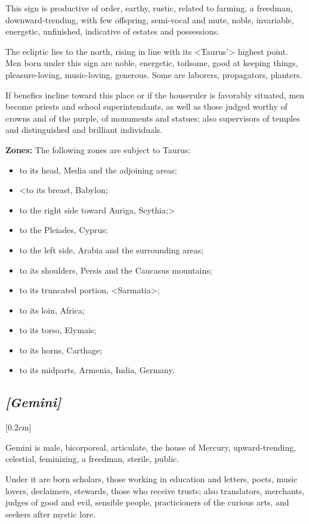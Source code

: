 This sign is productive of order, earthy, rustic, related to farming, a freedman, downward-trending, with few offspring, semi-vocal and mute, noble, invariable, energetic, unfinished, indicative of estates and possessions. 

The ecliptic lies to the north, rising in line with its <Taurus’> highest point. Men born under this sign are noble, energetic, toilsome, good at keeping things, pleasure-loving, music-loving, generous. Some are laborers, propagators, planters. 

If benefics incline toward this place or if the houseruler is favorably situated, men become priests and school superintendants, as well as those judged worthy of crowns and of the purple, of monuments and statues; also supervisors of temples and distinguished and brilliant individuals.

\textbf{Zones:} The following zones are subject to Taurus: 
\begin{itemize}
\item to its head, Media and the adjoining areas; 
\item <to its breast, Babylon; 
\item to the right side toward Auriga, Scythia;> 
\item to the Pleiades, Cyprus; 
\item to the left side, Arabia and the surrounding areas; 
\item to its shoulders, Persis and the Caucasus mountains; 
\item to its truncated portion, <Sarmatia>; 
\item to its loin, Africa; 
\item to its torso, Elymais; 
\item to its horns, Carthage; 
\item to its midparts, Armenia, India, Germany.
\end{itemize}

\secbr
\subsection{\textit{[Gemini]}}
[0.2cm]

Gemini is male, bicorporeal, articulate, the house of Mercury, upward-trending, celestial, feminizing, a freedman, sterile, public. 

Under it are born scholars, those working in education and letters, poets, music lovers, declaimers, stewards, those who receive trusts; also translators, merchants, judges of good and evil, sensible people, practicioners of the curious arts, and seekers after mystic lore. 

